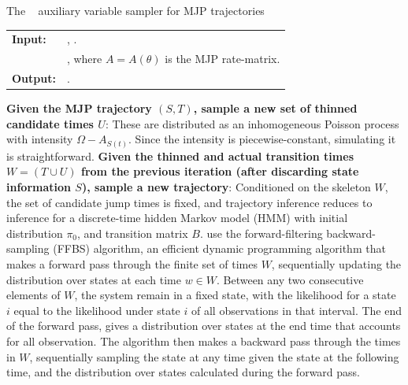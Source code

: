 \begin{algorithm}[H]
  \caption{The {\algname}~\cite{RaoTeh13} auxiliary variable sampler for MJP trajectories}
   \label{alg:Unif_gibbs}
  \begin{tabular}{l l}
   \textbf{Input:  } & \text{MJP parameters $\theta$ and $\pi_0$, observations $X$}, 
                       \text{the previous path $S(t) = (S, T)$}.\\ 
                     & \text{A  parameter $\Omega > \max_i A_i$}, where
   $A = A(\theta)$ is the MJP rate-matrix.\\
   \textbf{Output:  }& \text{A new MJP trajectory $\tilde{S} (t) = (\tilde{S}, \tilde{T})$}.\\
   \hline
   \end{tabular}
   \begin{algorithmic}[1]
\State \textbf{Given the MJP trajectory $(S,T)$, sample a new set of thinned 
candidate times $U$}: %
These are distributed as an inhomogeneous Poisson process with intensity 
$\Omega-A_{S(t)}$. Since the intensity is piecewise-constant, simulating it 
is straightforward.
\State \textbf{Given the thinned and actual transition times $W = (T \cup U)$
from the previous iteration (after discarding state information $S$), 
sample a new trajectory}:
    Conditioned on the skeleton $W$, the set of candidate jump
    times is fixed, and trajectory inference reduces to inference for
    a discrete-time hidden Markov model (HMM) with initial distribution
    $\pi_0$, and transition matrix $B$. \cite{RaoTeh13} use the forward-filtering
    backward-sampling (FFBS) algorithm, an efficient dynamic 
    programming algorithm that makes a forward pass through the
    finite set of times $W$, sequentially updating the 
    distribution over states at each time $w \in W$. 
    Between any two consecutive elements of $W$,
    the system remain in a fixed state, with the likelihood for a state $i$ equal
    to the likelihood under state $i$ of all observations 
    in that interval. 
    The end of the forward pass, gives a distribution over states at the
    end time that accounts for all observation.
    The algorithm then makes a backward pass through the times in $W$, 
    sequentially sampling the state at any time given the state at the 
    following time, and the distribution over states calculated during the
    forward pass. 
\end{algorithmic}
\end{algorithm}

